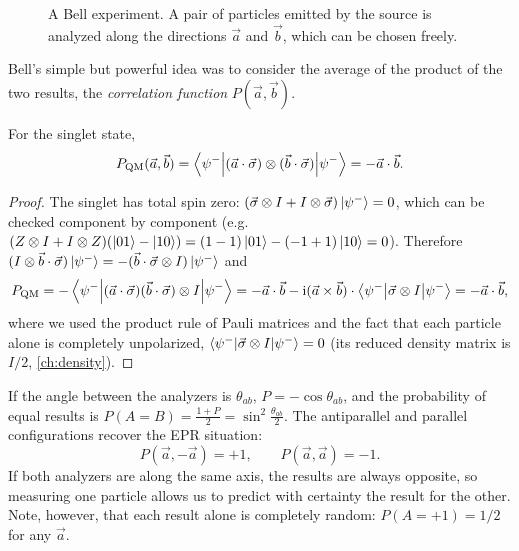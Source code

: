 \begin{figure}[h]\centering
{}
\caption{A Bell experiment. A pair of particles emitted by the source is analyzed along the directions $\vec a$ and $\vec b$, which can be chosen freely.}
\label{fig:bellsetup}
\end{figure}

Bell's simple but powerful idea was to consider the average of the product of the two results, the \emph{correlation function} $P(\vec a,\vec b)$.
\begin{proposition}
For the singlet state,
\begin{equation}\label{eq:singletcorr}
  P_{\rm QM}(\vec a,\vec b)=\left\langle\psi^-\middle|(\vec a\cdot\vec\sigma)\otimes(\vec b\cdot\vec\sigma)\middle|\psi^-\right\rangle=-\vec a\cdot\vec b.
\end{equation}
\end{proposition}
\begin{proof}
The singlet has total spin zero: $(\vec\sigma\otimes I+I\otimes\vec\sigma)\left|\psi^-\right\rangle=0$, which can be checked component by component (e.g.\
$(Z\otimes I+I\otimes Z)(\left|01\right\rangle-\left|10\right\rangle)=(1-1)\left|01\right\rangle-(-1+1)\left|10\right\rangle=0$). Therefore $(I\otimes\vec b\cdot\vec\sigma)\left|\psi^-\right\rangle=-(\vec b\cdot\vec\sigma\otimes I)\left|\psi^-\right\rangle$ and
\begin{equation}
  P_{\rm QM}=-\left\langle\psi^-\middle|(\vec a\cdot\vec\sigma)(\vec b\cdot\vec\sigma)\otimes I\middle|\psi^-\right\rangle
  =-\vec a\cdot\vec b-\mathrm i(\vec a\times\vec b)\cdot\left\langle\psi^-\middle|\vec\sigma\otimes I\middle|\psi^-\right\rangle=-\vec a\cdot\vec b,
\end{equation}
where we used the product rule of Pauli matrices and the fact that each particle alone is completely unpolarized,
$\left\langle\psi^-\middle|\vec\sigma\otimes I\middle|\psi^-\right\rangle=0$ (its reduced density matrix is $I/2$, \cref{ch:density}).
\end{proof}
If the angle between the analyzers is $\theta_{ab}$, $P=-\cos\theta_{ab}$, and the probability of equal results is $P(A=B)=\frac{1+P}2=\sin^2\frac{\theta_{ab}}2$.
The antiparallel and parallel configurations recover the EPR situation:
\begin{equation}
  P(\vec a,-\vec a)=+1,\qquad P(\vec a,\vec a)=-1.
\end{equation}
If both analyzers are along the same axis, the results are always opposite, so measuring one particle allows us to predict with certainty the result for the other.
Note, however, that each result alone is completely random: $P(A=+1)=1/2$ for any $\vec a$.

